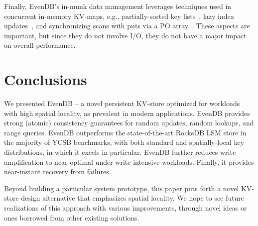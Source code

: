 \documentclass[sigplan,10pt]{acmart}
\newcommand{\sys}{EvenDB}
\begin{document}
Finally, \sys's in-munk data management leverages techniques used in concurrent in-memory KV-maps, e.g., partially-sorted 
key lists~\cite{Wu:2019:WFO:3302424.3303955,kiwi}, lazy index updates~\cite{kiwi,tdls}, 
and synchronizing scans with puts via a PO array~\cite{kiwi}. These aspects are important, but since they do not involve I/O, they do not have a major impact on overall performance.


\section{Conclusions}
\label{sec:conclusions}
We presented \sys\/ -- a novel persistent KV-store optimized for workloads with high spatial locality, as prevalent in modern %
applications. \sys\/ provides strong (atomic) consistency guarantees for random updates, random lookups, and range queries. 
\sys\/ outperforms the state-of-the-art RocksDB LSM store  in the  majority of YCSB benchmarks, with both 
standard and spatially-local key distributions, in which it excels in particular. \sys\/ further reduces write amplification to near-optimal under write-intensive 
workloads. Finally, it provides near-instant recovery from failures.

Beyond building a particular system prototype, this paper puts forth a novel KV-store design alternative that emphasizes spatial locality. We hope to see future realizations of this approach with various improvements, through novel ideas or ones borrowed from other existing solutions. 


\end{document}

